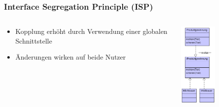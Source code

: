 \begin{frame}[fragile]
	\frametitle{Interface Segregation Principle (ISP)}
	\begin{columns}
		\begin{column}{0.5\textwidth}
			\small
			\begin{itemize}
			  \item Kopplung erh\"oht durch Verwendung einer
			  globalen Schnittstelle
			  \item \"Anderungen wirken auf beide Nutzer
			\end{itemize}
		\end{column}
		\begin{column}{0.5\textwidth}
			\center
	    	\includegraphics[width=0.5\textwidth,
	    	keepaspectratio=true]{bilder/isp_bad.png}
		\end{column}
	\end{columns}
\end{frame}

